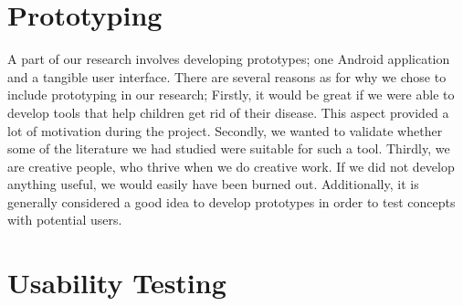 \section{Prototyping}
\label{sec:researchmethodprototyping}
A part of our research involves developing prototypes; one Android application and a tangible user interface. There are several reasons as for why we chose to include prototyping in our research; Firstly, it would be great if we were able to develop tools that help children get rid of their disease. This aspect provided a lot of motivation during the project. Secondly, we wanted to validate whether some of the literature we had studied were suitable for such a tool. Thirdly, we are creative people, who thrive when we do creative work. If we did not develop anything useful, we would easily have been burned out. Additionally, it is generally considered a good idea to develop prototypes in order to test concepts with potential users\cite{dumas1995practical}.
      
\section{Usability Testing}
\label{sec:usabilitytesting}
 